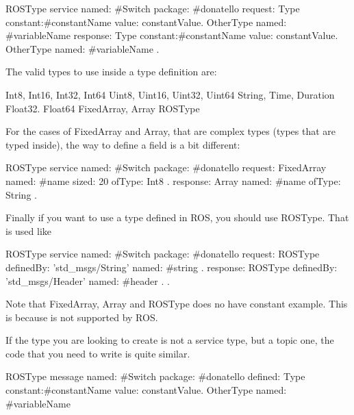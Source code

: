 \documentclass[a4paper,10pt,twoside]{book}
\begin{document}
				
				
			\begin{code}
					ROSType service named: #Switch package: #donatello request:{
							{Type} constant:#constantName value: constantValue.
							{OtherType} named: #variableName
						} response: { 
							{Type} constant:#constantName value: constantValue.
							{OtherType} named: #variableName
						}.
			\end{code}
			
				The valid types to use inside a type definition are:
			
			\begin{code}
				Int8, Int16, Int32, Int64
				Uint8, Uint16, Uint32, Uint64
				String, Time, Duration
				Float32. Float64
				FixedArray, Array
				ROSType 
			\end{code}
			
			For the cases of FixedArray and Array, that are complex types (types that are typed inside), the way to define a field is a bit different:

			
			
			\begin{code}
					ROSType service named: #Switch package: #donatello request:{
							FixedArray named: #name sized: 20 ofType: Int8 .
						} response: { 
							Array named: #name ofType: String
						}.
			\end{code}
			
			
			Finally if you want to use a type defined in ROS, you should use ROSType. That is used like
			
			
			\begin{code}
					ROSType service named: #Switch package: #donatello request:{
							ROSType definedBy: 'std_msgs/String' named: #string .
						} response: { 
							ROSType definedBy: 'std_msgs/Header' named: #header .
						}.
			\end{code}
			
			Note that FixedArray, Array and ROSType does no have constant example. This is because is not supported by ROS.
			
			
			If the type you are looking to create is not a service type, but a topic one, the code that you need to write is quite similar. 
			
			
			\begin{code}
					ROSType message named: #Switch package: #donatello defined:{
							{Type} constant:#constantName value: constantValue.
							{OtherType} named: #variableName
						} 
			\end{code}
				
\end{document}
